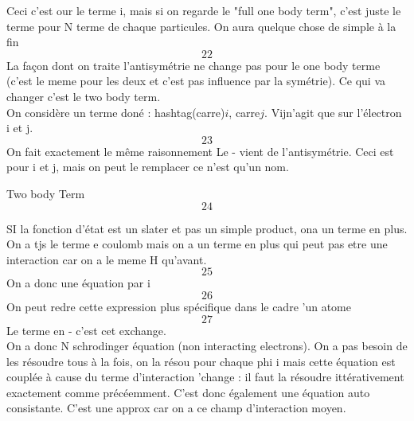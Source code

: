Ceci c'est our le  terme i, mais si on regarde le "full one body term", c'est juste le terme pour N terme de chaque particules. 
On aura quelque chose de simple à la fin
\begin{equation}
22
\end{equation}
La façon dont on traite l'antisymétrie ne change pas pour le one body terme (c'est le meme pour les deux et c'est pas influence
par la symétrie). Ce qui va changer c'est le two body term.\\

On considère un terme doné : hashtag(carre)$i$, carre$j$. Vijn'agit que sur l'électron i et j.  
\begin{equation}
23
\end{equation}
On fait exactement le même raisonnement Le - vient de l'antisymétrie. Ceci est pour i et j, mais on peut le remplacer ce 
n'est qu'un nom. 

Two body Term
\begin{equation}
24
\end{equation}


SI la fonction d'état est un slater et pas un simple product, ona un terme en plus. On a tjs le terme e coulomb mais on a 
un terme en plus qui peut pas etre une interaction car on a le meme H qu'avant.
\begin{equation}
25
\end{equation}
On a donc une équation par i
\begin{equation}
26
\end{equation}
On peut redre cette expression plus spécifique dans le cadre 'un atome
\begin{equation}
27
\end{equation}
Le terme en - c'est cet exchange.\\

On a donc N schrodinger équation (non interacting electrons).  On a pas besoin de les résoudre tous à la fois, on la 
résou pour chaque phi i mais cette équation est couplée à cause du terme d'interaction 'change : il faut la résoudre 
ittérativement exactement comme précéemment. C'est donc également une équation auto consistante. C'est une approx 
car on a ce champ d'interaction moyen.